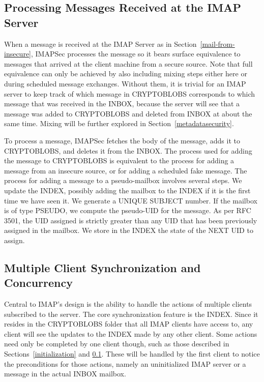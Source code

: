 \documentclass[pageno]{jpaper}
\newcommand{\project}{IMAPSec }
\begin{document}
\subsection{Processing Messages Received at the IMAP Server}
\label{processing}

When a message is received at the IMAP Server as in Section~\ref{mail-from-insecure}, \project processes the message so it bears surface equivalence to messages that arrived at the client machine from a secure source. Note that full equivalence can only be achieved by also including mixing steps either here or during scheduled message exchanges. Without them, it is trivial for an IMAP server to keep track of which message in CRYPTOBLOBS corresponds to which message that was received in the INBOX, because the server will see that a message was added to CRYPTOBLOBS and deleted from INBOX at about the same time. Mixing will be further explored in Section~\ref{metadatasecurity}.

To process a message, \project fetches the body of the message, adds it to CRYPTOBLOBS, and deletes it from the INBOX. The process used for adding the message to CRYPTOBLOBS is equivalent to the process for adding a message from an insecure source, or for adding a scheduled fake message. The process for adding a message to a pseudo-mailbox involves several steps. We update the INDEX, possibly adding the mailbox to the INDEX if it is the first time we have seen it. We generate a UNIQUE SUBJECT number. If the mailbox is of type PSEUDO, we compute the pseudo-UID for the message. As per RFC 3501, the UID assigned is strictly greater than any UID that has been previously assigned in the mailbox. We store in the INDEX the state of the NEXT UID to assign.


\subsection{Multiple Client Synchronization and Concurrency}
Central to IMAP's design is the ability to handle the actions of multiple clients subscribed to the server. The core synchronization feature is the INDEX. Since it resides in the CRYPTOBLOBS folder that all IMAP clients have access to, any client will see the updates to the INDEX made by any other client. Some actions need only be completed by one client though, such as those described in Sections~\ref{initialization} and \ref{processing}. These will be handled by the first client to notice the preconditions for those actions, namely an uninitialized IMAP server or a message in the actual INBOX mailbox.
\end{document}
